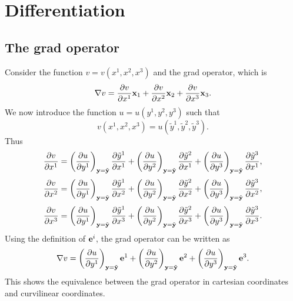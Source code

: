 \documentclass[11pt]{article}
\newcommand{\ytilde}{\tilde{y}}
\begin{document}
\section{Differentiation}
\subsection{The grad operator}
Consider the function $v = v(x^1, x^2, x^3)$ and the grad operator, which is  
\begin{equation}
    \nabla v = \frac{\partial v}{\partial x^1} \mathbf{x}_1 + \frac{\partial v}{\partial x^2} \mathbf{x}_2 + \frac{\partial v}{\partial x^3} \mathbf{x}_3.
\end{equation}
We now introduce the function $u = u(y^1,y^2,y^3)$ such that 
\begin{equation}
    v(x^1, x^2, x^3) = u(\ytilde^1, \ytilde^2, \ytilde^3).
\end{equation}
Thus
\begin{equation}
    \frac{\partial v}{\partial x^1} 
    = \left( \frac{ \partial u}{\partial y^1} \right)_{\yvec = \tilde{\yvec}} \frac{\partial \ytilde^1}{\partial x^1} 
    + \left( \frac{ \partial u}{\partial y^2} \right)_{\yvec = \tilde{\yvec}} \frac{\partial \ytilde^2}{\partial x^1} 
    + \left( \frac{ \partial u}{\partial y^3} \right)_{\yvec = \tilde{\yvec}} \frac{\partial \ytilde^3}{\partial x^1}, 
\end{equation}
\begin{equation}
    \frac{\partial v}{\partial x^2} 
    = \left( \frac{ \partial u}{\partial y^1} \right)_{\yvec = \tilde{\yvec}} \frac{\partial \ytilde^1}{\partial x^2} 
    + \left( \frac{ \partial u}{\partial y^2} \right)_{\yvec = \tilde{\yvec}} \frac{\partial \ytilde^2}{\partial x^2} 
    + \left( \frac{ \partial u}{\partial y^3} \right)_{\yvec = \tilde{\yvec}} \frac{\partial \ytilde^3}{\partial x^2},
\end{equation}
\begin{equation}
    \frac{\partial v}{\partial x^3} 
    = \left( \frac{ \partial u}{\partial y^1} \right)_{\yvec = \tilde{\yvec}} \frac{\partial \ytilde^1}{\partial x^3} 
    + \left( \frac{ \partial u}{\partial y^2} \right)_{\yvec = \tilde{\yvec}} \frac{\partial \ytilde^2}{\partial x^3} 
    + \left( \frac{ \partial u}{\partial y^3} \right)_{\yvec = \tilde{\yvec}} \frac{\partial \ytilde^3}{\partial x^3} .
\end{equation}
Using the definition of $\mathbf{e}^i$, the grad operator can be written as
\begin{equation}
    \label{eq:generic_gradient}
    \nabla v = \left ( \frac{\partial u }{\partial y^1} \right )_{\mathbf{y} = \tilde{\mathbf{y}}} \mathbf{e}^1 + \left ( \frac{\partial u }{\partial y^2} \right )_{\mathbf{y} = \tilde{\mathbf{y}}} \mathbf{e}^2 + \left ( \frac{\partial u }{\partial y^3} \right )_{\mathbf{y} = \tilde{\mathbf{y}}} \mathbf{e}^3 .
\end{equation}
This shows the equivalence between the grad operator in cartesian coordinates and curvilinear coordinates.
\end{document}
